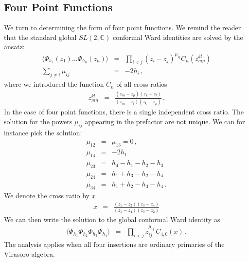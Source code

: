 \documentclass[12pt]{article}
\numberwithin{equation}{section}
\numberwithin{equation}{section}
\numberwithin{table}{section}\setlength{\multlinegap}{25pt}
\begin{document}
\subsection{Four Point Functions}
We turn to determining  the form of four point functions. We remind the reader that the standard
global $SL(2,\mathbb{C})$ conformal Ward identities   are solved
by the ansatz:
\begin{eqnarray}
\langle \Phi_{h_1}(z_1) \dots \Phi_{h_n}(z_n) \rangle
&=& \prod_{i < j} (z_i-z_j)^{\mu_{ij}} C_n(z^{kl}_{mp})
\nonumber \\
\sum_{j \neq i} \mu_{ij} &=& -2 h_i \, ,
\end{eqnarray}
where we introduced the function $C_n$ of all cross ratios
\begin{eqnarray}
z_{mn}^{kl} &=& \frac{(z_m-z_p)(z_k-z_l)}{(z_m-z_l)(z_k-z_p)} \, . 
\end{eqnarray}
In the case of four point functions, there is a single independent cross ratio. 
The solution for the powers $\mu_{ij}$ appearing in the prefactor are  not unique.
We can for instance pick the solution:
\begin{eqnarray}
\mu_{12} &=& \mu_{13} = 0 \, , \nonumber \\
\mu_{14} &=& -2 h_1 \nonumber \\
\mu_{23} &=& h_4-h_1-h_2-h_3 \nonumber \\
\mu_{24} &=& h_1+h_3-h_2-h_4  \nonumber \\
\mu_{34} &=& h_1+h_2 - h_3 - h_4 \, .
\end{eqnarray}
We denote the cross ratio by $x$ 
\begin{eqnarray}
x &=& \frac{(z_1-z_2)(z_3-z_4)}{(z_1-z_4)(z_3-z_2)} 
\end{eqnarray}
We can then write the solution to the global conformal Ward identity as
 \begin{eqnarray}
 \langle \Phi_{h_1} \Phi_{h_2} \Phi_{h_3} \Phi_{h_4} \rangle &=& 
\prod_{i<j} z_{ij}^{\mu_{ij}} \, 
 C_{4,0} (x) \,. \label{standardfourpoint}
 \end{eqnarray}
The analysis applies when all four insertions are ordinary primaries of the Virasoro algebra.
\end{document}
